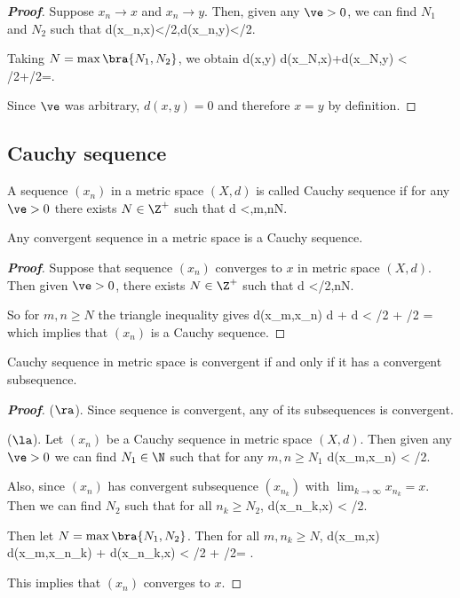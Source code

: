 \begin{proof}[\bf Proof]
Suppose $x_{n}\to x$ and $x_{n}\to y$. Then, given any $\ve>0$, we can find $N_{1}$ and $N_{2}$ such that
\be
d(x_{n},x)<\ve/2\quad {},\qquad d(x_{n},y)<\ve/2\quad {}.
\ee

Taking $N=\max\bra{N_{1},N_{2}}$, we obtain
\be
d(x,y) \leq d(x_{N},x)+d(x_{N},y) < \ve/2+\ve/2=\ve.
\ee

Since $\ve$ was arbitrary, $d(x,y)=0$ and therefore $x=y$ by definition.
\end{proof}

\subsection{Cauchy sequence}

\begin{definition}\label{def:cauchy_sequence_metric_space}
A sequence $(x_n)$ in a metric space $(X,d)$ is called Cauchy sequence if for any $\ve>0$ there exists $N\in \Z^+$ such that 
\be
d <\ve,\qquad{}m,n\geq N.
\ee
\end{definition}

\begin{proposition}\label{pro:convergent_sequence_is_cauchy_sequence_metric}
Any convergent sequence in a metric space is a Cauchy sequence. 
\end{proposition}

\begin{proof}[\bf Proof]
Suppose that sequence $(x_n)$ converges to $x$ in metric space $(X,d)$. Then given $\ve>0$, there exists $N\in \Z^+$ such that 
\be
d <\ve/2,\quad {}n\geq N.
\ee

So for $m,n\geq N$ the triangle inequality gives
\be
d(x_m,x_n) \leq d + d < \ve/2 + \ve/2 = \ve
\ee
which implies that $(x_n)$ is a Cauchy sequence.
\end{proof}


\begin{theorem}\label{thm:cauchy_sequence_convergent_iff_convergent_subsequence}
Cauchy sequence in metric space is convergent if and only if it has a convergent subsequence.
\end{theorem}

\begin{proof}[\bf Proof]
($\ra$). Since sequence is convergent, any of its subsequences is convergent.

($\la$). Let $(x_n)$ be a Cauchy sequence in metric space $(X,d)$. Then given any $\ve>0$ we can find $N_1\in \N$ such that for any $m,n\geq N_1$
\be
d(x_m,x_n) < \ve/2.
\ee

Also, since $(x_n)$ has convergent subsequence $(x_{n_k})$ with $\lim_{k\to \infty} x_{n_k} = x$. Then we can find $N_2$ such that for all $n_k \geq N_2$,
\be
d(x_{n_k},x) < \ve/2.
\ee

Then let $N = \max\bra{N_1,N_2}$. Then for all $m,n_{k}\geq N$,
\be
d(x_m,x) \leq d(x_m,x_{n_k}) + d(x_{n_k},x) < \ve/2 + \ve/2= \ve.
\ee

This implies that $(x_n)$ converges to $x$.
\end{proof}

